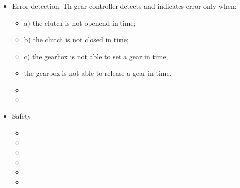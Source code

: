 \begin{itemize}
	\item Error detection: 	Th gear controller detects and indicates error only when:
	\begin{itemize}
			\item  	a) the clutch is not openend in time;
		\item 	b) the clutch is not closed in time;
		\item  	c) the gearbox is not able to set a gear in time,
		\item  	the gearbox is not able to release a gear in time.
		\item 
		\item  
	\end{itemize}





	\item Safety
	\begin{itemize}
			\item 
		\item 
		\item 
		\item 
		\item 
		\item  
	\end{itemize}


\end{itemize}
